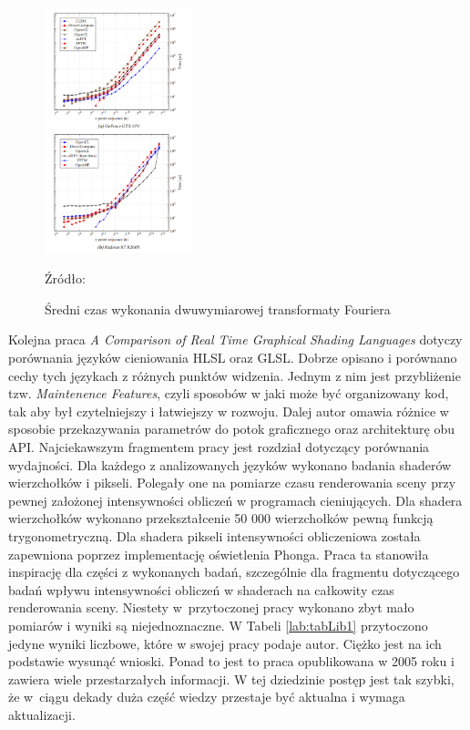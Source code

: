 \documentclass[archive]{mgr}
\begin{document}
\begin{figure}[h!]
  \centering
    \includegraphics[width=0.38\textwidth]{images/lit/1.png}
   \caption{Średni czas wykonania dwuwymiarowej transformaty Fouriera}
   Źródło: \cite{lit1}
   \label{lab:liter12}
\end{figure}
\newpage

Kolejna praca \emph{A Comparison of Real Time Graphical Shading Languages} \cite{lit2} dotyczy porównania języków cieniowania HLSL oraz GLSL. Dobrze opisano i porównano cechy tych językach z różnych punktów widzenia. Jednym z nim jest przybliżenie tzw. \emph{Maintenence Features}, czyli sposobów w jaki może być organizowany kod, tak aby był czytelniejszy i łatwiejszy w rozwoju. Dalej autor omawia różnice w sposobie przekazywania parametrów do potok graficznego oraz architekturę obu API. Najciekawszym fragmentem pracy jest rozdział dotyczący porównania wydajności. Dla każdego z analizowanych języków wykonano badania shaderów wierzchołków i pikseli. Polegały one na pomiarze czasu renderowania sceny przy pewnej założonej intensywności obliczeń w programach cieniujących. Dla shadera wierzchołków wykonano przekształcenie 50 000 wierzchołków pewną funkcją trygonometryczną. Dla shadera pikseli intensywności obliczeniowa została zapewniona poprzez implementację oświetlenia Phonga. Praca ta stanowiła inspirację dla części z wykonanych badań, szczególnie dla fragmentu dotyczącego badań wpływu intensywności obliczeń w shaderach na całkowity czas renderowania sceny. Niestety w~przytoczonej pracy wykonano zbyt mało pomiarów i wyniki są niejednoznaczne. W Tabeli \ref{lab:tabLib1} przytoczono jedyne wyniki liczbowe, które w swojej pracy podaje autor. Ciężko jest na ich podstawie wysunąć wnioski. Ponad to jest to praca opublikowana w 2005 roku i zawiera wiele przestarzałych informacji. W tej dziedzinie postęp jest tak szybki, że w~ciągu dekady duża część wiedzy przestaje być aktualna i wymaga aktualizacji.
\end{document}
